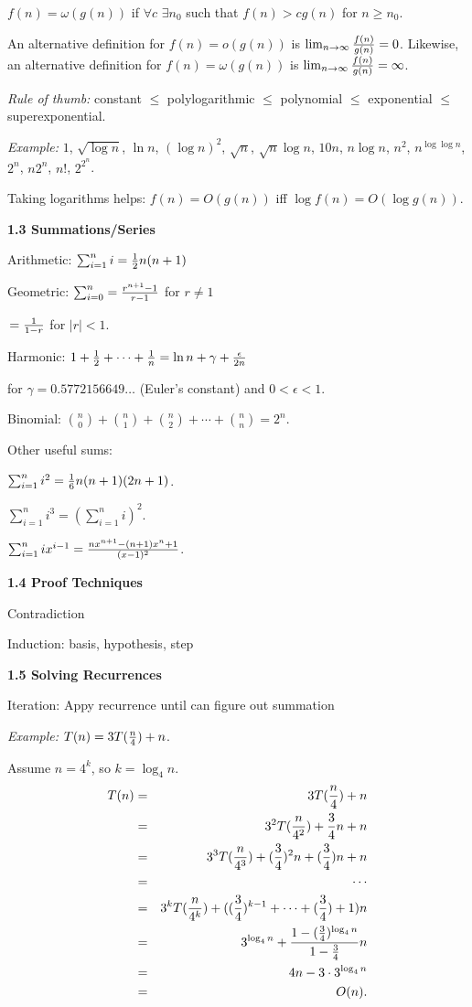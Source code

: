 \documentclass[8pt]{minimal}
\begin{document}
\begin{flushleft}
\begin{multicols}{3}
\item $f(n)=\omega(g(n))$ if $\forall c$ $\exists n_0$ such that 
$f(n)>cg(n)$ for $n\ge n_0$.


An alternative definition for $f(n)=o(g(n))$ is 
$\lim_{n\to\infty}{f(n)\over g(n)}=0$. Likewise, an alternative definition
for $f(n)=\omega(g(n))$ is $\lim_{n\to\infty}{f(n)\over g(n)}=\infty$.

{\em Rule of thumb:} constant $\le$ polylogarithmic $\le$ polynomial
$\le$ exponential $\le$ superexponential.

{\em Example:} $1$, $\sqrt{\log n}$, $\ln n$, $(\log n)^2$, $\sqrt n$,
$\sqrt n \log n$, $10n$, $n\log n$, $n^2$, $n^{\log\log n}$,
$2^n$, $n2^n$, $n!$, $2^{2^n}$.

Taking logarithms helps: $f(n)=O(g(n))$ iff $\log f(n)=O(\log g(n))$.


    \textbf{1.3 Summations/Series}

Arithmetic: $\sum_{i=1}^{n} i = {1\over2}n(n+1)$

Geometric: $\sum_{i=0}^{n} = {{r^{n+1}-1}\over{r-1}}$ for
$r\not=1$

\;\;\;\;\;\;\;\;\;\;\;\;\,\;\;\;\;\;\;\;\;\;\;\;\;\;\;\;\;$={1\over{1-r}}$ for $|r|<1$.

Harmonic: $1+{1\over2}+\cdots+{1\over n}
=\ln n+\gamma+{\epsilon\over{2n}}$

for $\gamma=0.5772156649\ldots$
(Euler's constant) and $0<\epsilon<1$.


Binomial: ${n\choose 0}+{n\choose 1}+{n\choose 2}+
\cdots+{n\choose n}=2^n$.

Other useful sums:

$\sum_{i=1}^n i^2={1\over6}n(n+1)(2n+1)$.

$\sum_{i=1}^n i^3=(\sum_{i=1}^n i)^2$.

$\sum_{i=1}^n ix^{i-1}={{nx^{n+1}-(n+1)x^n+1}\over{(x-1)^2}}$.


    \textbf{1.4 Proof Techniques}

Contradiction

Induction: basis, hypothesis, step



    \textbf{1.5 Solving Recurrences}

Iteration: Appy recurrence until can figure out summation

{\em Example:} $T(n)=3T({n\over4})+n$.

Assume $n=4^k$, so $k=\log_4 n$.
\begin{eqnarray*}
T(n)&=&3T({n\over4})+n\\
&=&3^2T({n\over{4^2}})+{3\over4}n+n\\
&=&3^3T({n\over{4^3}})+({3\over4})^2n+({3\over4})n+n\\
&=&\cdots\\
&=&3^kT({n\over{4^k}})+(({3\over4})^{k-1}+\cdots+({3\over4})+1)n\\
&=&3^{\log_4 n}+{{1-({3\over4})^{\log_4 n}}\over{1-{3\over4}}}n\\
&=&4n-3\cdot 3^{\log_4 n}\\
&=&O(n).
\end{eqnarray*}



\end{multicols}
\end{flushleft}
\end{document}
